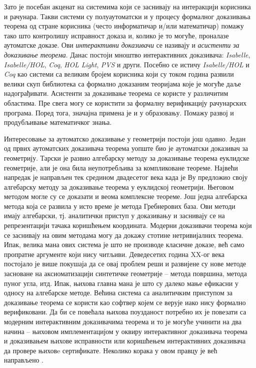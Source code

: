 Зато је посебан акценат на системима који се заснивају на интеракцији
корисника и рачунара. Такви системи су полуаутоматски и у процесу
формалног доказивања теорема од стране корисника (често информатичар
и/или математичар) помажу тако што контролишу исправност доказа и,
колико је то могуће, проналазе аутоматске доказе. Ови {\em
  интерактивни доказивачи} се називају и {\em асистенти за доказивање
  теорема}. Данас постоји мноштво интерактивних доказивача:
\emph{Isabelle}, \emph{Isabelle/HOL}, \emph{Coq}, \emph{HOL Light},
\emph{PVS} и други. Посебно се истичу \emph{Isabelle/HOL} и \emph{Coq}
као системи са великим бројем корисника који су током година развили
велики скуп библиотека са формално доказаним теоријама које је могуће
даље надограђивати. Асистенти за доказивање теорема се користе у
различитим областима. Пре свега могу се користити за формалну
верификацију рачунарских програма. Поред тога, значајна примена је и у
образовању. Помажу развој и продубљивање математичког знања.


Интересовање за аутоматско доказивање у геометрији постоји још
одавно. Један од првих аутоматских доказивача теорема уопште био је
аутоматски доказивач за геометрију. Тарски је развио алгебарску методу
за доказивање теорема еуклидске геометрије, али је она била
неупотребљива за компликоване теореме. Највећи напредак је направљен
тек средином двадесетог века када је Ву предложио своју алгебарску
методу за доказивање теорема у еуклидској геометрији. Његовом методом
могле су се доказати и веома комплексне теореме. Још једна алгебарска
метода која се развила у исто време је метода Гребнерових база. Ови
методи имају алгебарски, тј. аналитички приступ у доказивању и
заснивају се на репрезентацији тачака коришћењем
координата. Мо\-де\-рни доказивачи теорема који се заснивају на овим
методама могу да докажу стотине нетривијалних теорема. Ипак, велика
мана ових система је што не производе класичне доказе, већ само
пропратне аргументе који нису читљиви. Деведесетих година XX-ог века
постојало је више покушаја да се овај проблем реши и развијене су нове
методе засноване на аксиоматизацији синтетичке геометрије -- метода
површина, метода пуног угла, итд. Ипак, њихова главна мана је што су
далеко мање ефикасни у односу на алгебарске методе. Већина система са
аналитичким приступом за доказивање теорема се користи као софтвер
којем се верује иако нису формално верификовани. Да би се повећала
њихова поузданост потребно их је повезати са модерним интерактивним
доказивачима теорема и то је могуће учинити на два начина -- њиховом
имплементацијом у оквиру интерактивног доказивача теорема и
доказивањем њихове исправности или коришћењем интерактивних доказивача
да провере њиховe сертификате. Неколико корака у овом правцу је већ
направљено \cite{wucoq,thedu}.

